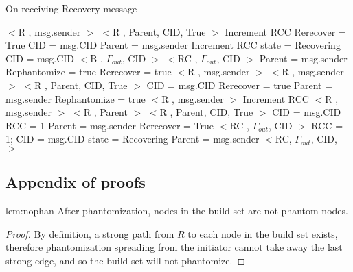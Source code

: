 \begin{algorithm}[H]
\caption{On receiving Recovery message}
\label{Recovery message received}
\scriptsize
\begin{algorithmic}[1]
	\State $<$R , msg.sender $>$
		\State $<$R , Parent, CID, True $>$
	\EndIf
	\State Increment RCC 
	\State Rerecover = True
	\State CID = msg.CID
	\State Parent = msg.sender
	\State Increment RCC
	\State state = Recovering
	\State CID = msg.CID
	\State $<$B , $\Gamma_{out}$, CID $>$
  \Else
	\State $<$RC , $\Gamma_{out}$, CID $>$
  \EndIf
	\State Parent = msg.sender
		\State Rephantomize = true
		\State Rerecover = true
		\State $<$R , msg.sender $>$
		\State $<$R , msg.sender $>$
	\Else
			\State $<$R , Parent, CID, True $>$
		\EndIf
		\State CID = msg.CID
		\State Rerecover = true
		\State Parent = msg.sender
		\State Rephantomize = true
	\EndIf
{}
		\State $<$R , msg.sender $>$
		\State Increment RCC
		\State $<$R , msg.sender $>$
			\State $<$R , Parent $>$
		\EndIf
	\Else
			\State $<$R , Parent, CID, True $>$
		\EndIf
		\State CID = msg.CID
		\State RCC = 1
		\State Parent = msg.sender
			\State Rerecover = True	
		\Else 
			\State $<$RC , $\Gamma_{out}$, CID $>$
		\EndIf
	\EndIf
{}
	\State RCC = 1;
	\State CID = msg.CID
	\State state = Recovering
	\State Parent = msg.sender
	\State $<$RC,  $\Gamma_{out}$, CID, $>$
\EndIf
\EndProcedure
\end{algorithmic}
\end{algorithm}	

\subsection{Appendix of proofs}
\label{proofapp}
\begin{replemma}{lem:nophan}
After phantomization, nodes in the build set are not phantom nodes.
\end{replemma}
\begin{proof}
By definition, a strong path from $R$ to each node in the build set
exists, therefore phantomization spreading from the initiator cannot take
away the last strong edge, and so the build set will not phantomize.
\end{proof}

